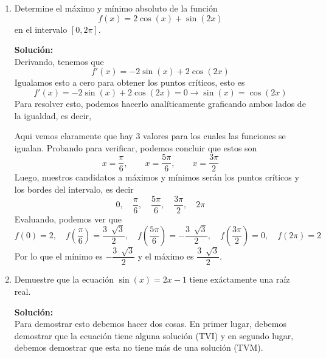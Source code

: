\documentclass[12pt]{article}
\newenvironment{solucion}
{\begin{mdframed}[backgroundcolor=black!10]
		{\bf Solución:}\\
	}
	{
	\end{mdframed}
}
\newenvironment{preguntas}
{\begin{enumerate}\itemsep12pt
	}
	{
	\end{enumerate}
}
\newcommand{\ra}{\rightarrow}
\begin{document}
\begin{preguntas}
\begin{solucion}
Luego,
$$(f^{-1})'(x) = 
\dfrac{1}{f'(f^{-1}(x))} = 
\dfrac{1}{\dfrac{e^{f(f^{-1}(x))}}{1+(f(f^{-1}(x)))^2}}$$
Notemos que 
$$f(f^{-1}(x)) = x$$
Finalmente,
$$(f^{-1})'(x) = \dfrac{1}{\dfrac{e^x}{1+x^2}} = \dfrac{1+x^2}{e^x}$$
\end{solucion}
\item Determine el máximo y mínimo absoluto de la función 
$$f(x) = 2\cos (x) + \sin (2x)$$
en el intervalo $[0, 2\pi]$.
\begin{solucion}
Derivando, tenemos que
$$f'(x) = -2 \sin(x) + 2 \cos(2x)$$
Igualamos esto a cero para obtener los puntos críticos, esto es
$$f'(x) = -2 \sin(x) + 2 \cos(2x) = 0 \ra \sin(x) = \cos(2x)$$
Para resolver esto, podemos hacerlo analíticamente graficando ambos lados de la igualdad, es decir,
\begin{center}
\end{center}
Aqui vemos claramente que hay 3 valores para los cuales las funciones se igualan. Probando para verificar, podemos concluir que estos son
$$x = \dfrac{\pi}{6}, \qquad x = \dfrac{5\pi}{6}, \qquad x = \dfrac{3\pi}{2}$$
Luego, nuestros candidatos a máximos y mínimos serán los puntos críticos y los bordes del intervalo, es decir
$$0, \quad \dfrac{\pi}{6}, \quad \dfrac{5\pi}{6}, \quad \dfrac{3\pi}{2}, \quad 2\pi$$
Evaluando, podemos ver que
$$f(0) = 2, \quad f(\dfrac{\pi}{6}) = \dfrac{3\ \sqrt[]{3}}{2}, \quad f(\dfrac{5\pi}{6}) = -\dfrac{3\ \sqrt[]{3}}{2}, \quad f(\dfrac{3\pi}{2}) = 0, \quad f(2\pi) = 2$$
Por lo que el mínimo es $-\dfrac{3\ \sqrt[]{3}}{2}$ y el máximo es $\dfrac{3\ \sqrt[]{3}}{2}$.
\end{solucion}
\item Demuestre que la ecuación $\sin (x) = 2x-1$ tiene exáctamente una raíz real.
\begin{solucion}
Para demostrar esto debemos hacer dos cosas. En primer lugar, debemos demostrar que la ecuación tiene alguna solución (TVI) y en segundo lugar, debemos demostrar que esta no tiene más de una solución (TVM).\\


\end{solucion}
\end{preguntas}
\end{document}
